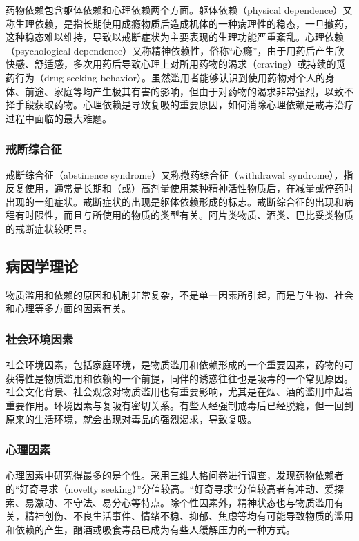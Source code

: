 药物依赖包含躯体依赖和心理依赖两个方面。躯体依赖（physical
dependence）又称生理依赖，是指长期使用成瘾物质后造成机体的一种病理性的稳态，一旦撤药，这种稳态难以维持，导致以戒断症状为主要表现的生理功能严重紊乱。心理依赖（psychological
dependence）又称精神依赖性，俗称``心瘾''，由于用药后产生欣快感、舒适感，多次用药后导致心理上对所用药物的渴求（craving）或持续的觅药行为（drug
seeking
behavior）。虽然滥用者能够认识到使用药物对个人的身体、前途、家庭等均产生极其有害的影响，但由于对药物的渴求非常强烈，以致不择手段获取药物。心理依赖是导致复吸的重要原因，如何消除心理依赖是戒毒治疗过程中面临的最大难题。

\subsubsection{戒断综合征}

戒断综合征（abstinence syndrome）又称撤药综合征（withdrawal
syndrome），指反复使用，通常是长期和（或）高剂量使用某种精神活性物质后，在减量或停药时出现的一组症状。戒断症状的出现是躯体依赖形成的标志。戒断综合征的出现和病程有时限性，而且与所使用的物质的类型有关。阿片类物质、酒类、巴比妥类物质的戒断症状较明显。

\subsection{病因学理论}

物质滥用和依赖的原因和机制非常复杂，不是单一因素所引起，而是与生物、社会和心理等多方面的因素有关。

\subsubsection{社会环境因素}

社会环境因素，包括家庭环境，是物质滥用和依赖形成的一个重要因素，药物的可获得性是物质滥用和依赖的一个前提，同伴的诱惑往往也是吸毒的一个常见原因。社会文化背景、社会观念对物质滥用也有重要影响，尤其是在烟、酒的滥用中起着重要作用。环境因素与复吸有密切关系。有些人经强制戒毒后已经脱瘾，但一回到原来的生活环境，就会出现对毒品的强烈渴求，导致复吸。

\subsubsection{心理因素}

心理因素中研究得最多的是个性。采用三维人格问卷进行调查，发现药物依赖者的``好奇寻求（novelty
seeking）''分值较高。``好奇寻求''分值较高者有冲动、爱探索、易激动、不守法、易分心等特点。除个性因素外，精神状态也与物质滥用有关，精神创伤、不良生活事件、情绪不稳、抑郁、焦虑等均有可能导致物质的滥用和依赖的产生，酗酒或吸食毒品已成为有些人缓解压力的一种方式。

